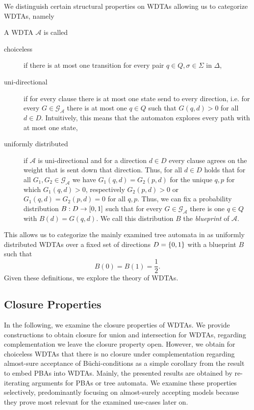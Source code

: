 We distinguish certain structural properties on \acp{WDTA} allowing us to
categorize \acp{WDTA}, namely
\begin{definition}
  A \ac{WDTA} $\mathcal{A}$ is called
  \begin{description}
    \item [choiceless] if there is at most one transition for every pair 
      $q\in Q, \sigma\in\Sigma$ in $\Delta$,
    \item [uni-directional] if for every clause there is at most one state send
      to every direction, i.e. for every $G\in\mathcal{G}_{\mathcal{A}}$
      there is at most one $q\in Q$ such that $G(q, d) > 0$ for all
      $d\in D$. Intuitively, this means that the automaton explores every path
      with at most one state,
    \item [uniformly distributed] if $\mathcal{A}$ is uni-directional
      and for a direction $d\in D$ every clause agrees on the weight that is
      sent down that direction. Thus, for all $d\in D$ holds that for all
      $G_{1}, G_{2}\in\mathcal{G}_{\mathcal{A}}$ we have
      $G_{1}(q, d) = G_{2}(p, d)$ for the unique $q, p$ for which
      $G_{1}(q, d) > 0$, respectively $G_{2}(p, d) > 0$ or
      $G_{1}(q, d) = G_{2}(p, d) = 0$ for all $q, p$. Thus, we can fix a
      probability distribution $B:D\rightarrow \left[0,1\right]$ such that for
      every $G\in\mathcal{G}_{\mathcal{A}}$ there is one $q\in Q$ with
      $B(d) = G(q, d)$. We call this distribution $B$ the \emph{blueprint} of
      $\mathcal{A}$. 
  \end{description}
\end{definition}
This allows us to categorize the mainly examined tree automata in 
\cite{RandAutoInfTrees} as uniformly distributed \acp{WDTA} over a fixed set of
directions $D = \left\{0,1\right\}$ with a blueprint $B$ such that
\begin{equation*}
  B(0) = B(1) = \frac{1}{2}.
\end{equation*}
Given these definitions, we explore the theory of \acp{WDTA}.

\subsection{Closure Properties}
In the following, we examine the closure properties of \acp{WDTA}. We provide
constructions to obtain closure for union and intersection for \acp{WDTA}, 
regarding complementation we leave the closure property open. However, we
obtain for choiceless \acp{WDTA} that there is no closure under complementation
regarding almost-sure acceptance of Büchi-conditions as a simple corollary from
the result to embed \acp{PBA} into \acp{WDTA}. Mainly, the presented results
are obtained by re-iterating arguments for \acp{PBA} or tree automata. We
examine these properties selectively, predominantly focusing on almost-surely
accepting models because they prove most relevant for the examined use-cases
later on. 

